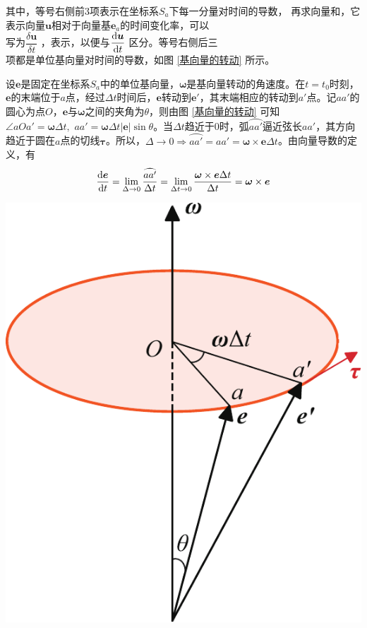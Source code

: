 \noindent
\begin{minipage}{0.6\linewidth}
	其中，等号右侧前3项表示在坐标系$S_a$下每一分量对时间的导数， 再求向量和，它表示向量$\bm{u}$相对于向量基$\bm{e}_a$的时间变化率，可以\\[0.2em]
	写为$\dfrac{\delta \bm{u}}{\delta t}$ ，表示，以便与$\dfrac{{\rm{d}} \bm{u}}{{\rm{d}} t}$ 区分。等号右侧后三\\[0.2em]
	项都是单位基向量对时间的导数，如图 \ref{基向量的转动} 所示。
	
	\qquad 设$\bm{e}$是固定在坐标系$S_a$中的单位基向量，$\bm{\omega}$是基向量转动的角速度。在$t = t_0$时刻，$\bm{e}$的末端位于$a$点，经过$\Delta t$时间后，$\bm{e}$转动到$\bm{e}'$，其末端相应的转动到$a'$点。记$aa'$的圆心为点$O$，$\bm{e}$与$\bm{\omega}$之间的夹角为$\theta$，则由图 \ref{基向量的转动} 可知$\angle aOa' = \bm{\omega} \Delta t,\, \, aa' = \bm{\omega}\Delta t |\bm{e}| \sin \theta$。当$\Delta t$趋近于0时，弧$\wideparen{aa'}$逼近弦长$aa'$，其方向趋近于圆在$a$点的切线$\bm{\tau}$。所以，$\Delta \to 0 \Rightarrow \wideparen{aa'} = aa' = \bm{\omega} \times \bm{e}\Delta t$。由向量导数的定义，有
	\begin{equation}
		\dfrac{\d \bm{e}}{\d t} = \lim\limits_{\Delta \to 0}\dfrac{\wideparen{aa'}}{\Delta t} = \lim\limits_{\Delta t \to 0} \dfrac{\bm{\omega} \times \bm{e} \Delta t}{\Delta t} = \bm{\omega} \times \bm{e}
	\end{equation}
\end{minipage}
\begin{minipage}{0.4\linewidth}
	\centering
	\includegraphics[width=0.8\linewidth]{pic/向量转动}
	\label{基向量的转动}
\end{minipage}
\vspace*{0.5em}

